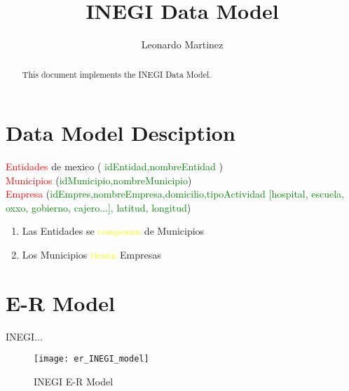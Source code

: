 \documentclass[10pt]{article}         %
\title{INEGI Data Model}
\author{Leonardo Martinez}
\begin{document}
\maketitle

\begin{abstract}
This document implements the INEGI Data Model.
\end{abstract}

\section{Data Model Desciption}


\textcolor{red}{Entidades} de mexico ( \textcolor{green}{idEntidad,nombreEntidad} )\\
\textcolor{red}{Municipios} (\textcolor{green}{idMunicipio,nombreMunicipio})\\
\textcolor{red}{Empresa} (\textcolor{green}{idEmpres,nombreEmpresa,domicilio,tipoActividad [hospital, escuela, oxxo, gobierno, cajero...], latitud, longitud})\\

\begin{enumerate}
\item
Las Entidades se \textcolor{yellow}{componen} de Municipios \\
\item
Los Municipios \textcolor{yellow}{tienen} Empresas\\
\end{enumerate}


\section{E-R Model}

INEGI...

\begin{figure}[h]
     \texttt{[image: er\_INEGI\_model]}
     \caption{INEGI E-R Model}
\end{figure}
   
\end{document}
